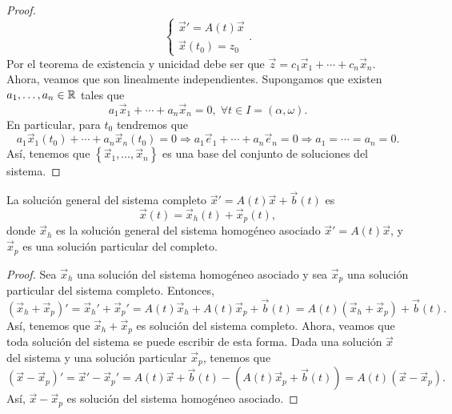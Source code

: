 \begin{proof}
\[\begin{cases}
\vec{x}' = A\left(t\right)\vec{x} \\
\vec{x}\left(t_{0}\right)=z_{0}
\end{cases}
.\]
Por el teorema de existencia y unicidad debe ser que $\displaystyle \vec{z} = c_{1}\vec{x}_{1} + \cdots + c_{n}\vec{x}_{n}$. Ahora, veamos que son linealmente independientes. Supongamos que existen $\displaystyle a_{1}, \ldots, a_{n} \in \mathbb{R} $ tales que 
\[a_{1}\vec{x}_{1} + \cdots + a_{n}\vec{x}_{n}=0, \; \forall t \in I = \left(\alpha , \omega \right) .\]
En particular, para $\displaystyle t_{0}  $ tendremos que
\[a_{1}\vec{x}_{1}\left(t_{0}\right) +\cdots + a_{n}\vec{x}_{n}\left(t_{0}\right)=0 \Rightarrow a_{1}\vec{e}_{1} + \cdots + a_{n}\vec{e}_{n}= 0 \Rightarrow a_{1} = \cdots =a_{n}=0 .\]
Así, tenemos que $\displaystyle \left\{ \vec{x}_{1}, \ldots, \vec{x}_{n}\right\}  $ es una base del conjunto de soluciones del sistema. 
\end{proof}

\begin{colorary}
La solución general del sistema completo $\displaystyle \vec{x}' = A\left(t\right)\vec{x} +\vec{b}\left(t\right)$ es 
\[\vec{x}\left(t\right)=\vec{x}_{h}\left(t\right)+\vec{x}_{p}\left(t\right) ,\]
donde $\displaystyle \vec{x}_{h} $ es la solución general del sistema homogéneo asociado $\displaystyle \vec{x}' = A\left(t\right)\vec{x} $, y $\displaystyle \vec{x}_{p} $ es una solución particular del completo. 
\end{colorary}
\begin{proof}
Sea $\displaystyle \vec{x}_{h} $ una solución del sistema homogéneo asociado y sea $\displaystyle \vec{x}_{p} $ una solución particular del sistema completo. Entonces,
\[\left(\vec{x}_{h}+\vec{x}_{p}\right)' = \vec{x}_{h}' + \vec{x}_{p}' = A\left(t\right)\vec{x}_{h}+A\left(t\right)\vec{x}_{p} + \vec{b}\left(t\right)=A\left(t\right)\left(\vec{x}_{h}+\vec{x}_{p}\right)+\vec{b}\left(t\right)	 .\]
Así, tenemos que $\displaystyle \vec{x}_{h}+\vec{x}_{p} $ es solución del sistema completo. Ahora, veamos que toda solución del sistema se puede escribir de esta forma. Dada una solución $\displaystyle \vec{x} $ del sistema y una solución particular $\displaystyle \vec{x}_{p} $, tenemos que
\[\left(\vec{x}-\vec{x}_{p}\right)' = \vec{x}' - \vec{x}_{p}' = A\left(t\right)\vec{x} + \vec{b}\left(t\right) - \left(A\left(t\right)\vec{x}_{p}+\vec{b}\left(t\right)\right)=A\left(t\right)\left(\vec{x}-\vec{x}_{p}\right).\]
Así, $\displaystyle \vec{x}-\vec{x}_{p} $ es solución del sistema homogéneo asociado. 
\end{proof}

